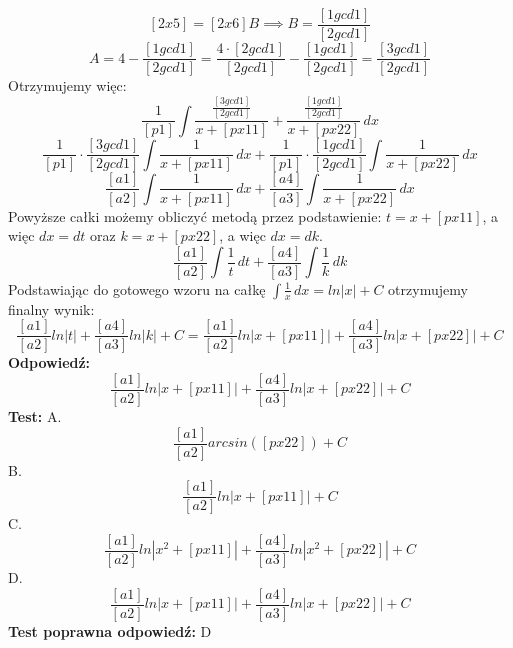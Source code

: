 \documentclass[12pt, a4paper]{article}
\theoremstyle{definition} %
\newcommand{\rozwStop}{\newline}                                            %
\newcommand{\odpStart}{\noindent \textbf{Odpowiedź:}\newline}    %
\newcommand{\odpStop}{\newline}                                             %
\newcommand{\testStart}{\noindent \textbf{Test:}\newline} %
\newcommand{\testStop}{\newline} %
\newcommand{\kluczStart}{\noindent \textbf{Test poprawna odpowiedź:}\newline} %
\newcommand{\kluczStop}{\newline} %
\begin{document}
$$[2x5]=[2x6]B\implies B=\frac{[1gcd1]}{[2gcd1]}$$
$$A=4-\frac{[1gcd1]}{[2gcd1]}=\frac{4\cdot[2gcd1]}{[2gcd1]}-\frac{[1gcd1]}{[2gcd1]}=\frac{[3gcd1]}{[2gcd1]}$$
Otrzymujemy więc:
$$\frac{1}{[p1]}\int \frac{\frac{[3gcd1]}{[2gcd1]}}{x+[px11]}+\frac{\frac{[1gcd1]}{[2gcd1]}}{x+[px22]} \,dx$$
$$\frac{1}{[p1]}\cdot\frac{[3gcd1]}{[2gcd1]}\int \frac{1}{x+[px11]} \,dx+\frac{1}{[p1]}\cdot\frac{[1gcd1]}{[2gcd1]}\int \frac{1}{x+[px22]} \,dx$$
$$\frac{[a1]}{[a2]}\int \frac{1}{x+[px11]} \,dx+\frac{[a4]}{[a3]}\int \frac{1}{x+[px22]} \,dx$$
Powyższe całki możemy obliczyć metodą przez podstawienie: $t=x+[px11]$, a więc $dx=dt$ oraz $k=x+[px22]$, a więc $dx=dk$.
$$\frac{[a1]}{[a2]}\int \frac{1}{t} \,dt+\frac{[a4]}{[a3]}\int \frac{1}{k} \,dk$$
Podstawiając do gotowego wzoru na całkę $\int \frac{1}{x} \,dx=ln|x|+C$ otrzymujemy finalny wynik:
$$\frac{[a1]}{[a2]}ln|t|+\frac{[a4]}{[a3]}ln|k|+C=\frac{[a1]}{[a2]}ln|x+[px11]|+\frac{[a4]}{[a3]}ln|x+[px22]|+C$$
\rozwStop
\odpStart
$$\frac{[a1]}{[a2]}ln|x+[px11]|+\frac{[a4]}{[a3]}ln|x+[px22]|+C$$
\odpStop
\testStart
A.$$\frac{[a1]}{[a2]}arcsin([px22])+C$$
B.$$\frac{[a1]}{[a2]}ln|x+[px11]|+C$$
C.$$\frac{[a1]}{[a2]}ln|x^2+[px11]|+\frac{[a4]}{[a3]}ln|x^2+[px22]|+C$$
D.$$\frac{[a1]}{[a2]}ln|x+[px11]|+\frac{[a4]}{[a3]}ln|x+[px22]|+C$$
\testStop
\kluczStart
D
\kluczStop
\end{document}
